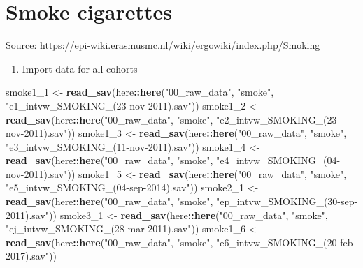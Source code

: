 \documentclass[]{book}
\newenvironment{Shaded}{\begin{snugshade}}{\end{snugshade}}
\newcommand{\DecValTok}[1]{\textcolor[rgb]{0.00,0.00,0.81}{#1}}
\newcommand{\KeywordTok}[1]{\textcolor[rgb]{0.13,0.29,0.53}{\textbf{#1}}}
\newcommand{\NormalTok}[1]{#1}
\newcommand{\OperatorTok}[1]{\textcolor[rgb]{0.81,0.36,0.00}{\textbf{#1}}}
\newcommand{\StringTok}[1]{\textcolor[rgb]{0.31,0.60,0.02}{#1}}
\providecommand{\tightlist}{%
  \setlength{\itemsep}{0pt}\setlength{\parskip}{0pt}}
\begin{document}
\hypertarget{smoke_cig}{%
\chapter{Smoke cigarettes}\label{smoke_cig}}

Source: \url{https://epi-wiki.erasmusmc.nl/wiki/ergowiki/index.php/Smoking}

\begin{enumerate}
\def\labelenumi{\arabic{enumi}.}
\tightlist
\item
  Import data for all cohorts
\end{enumerate}

\begin{Shaded}
\begin{Highlighting}[]
\NormalTok{smoke1_}\DecValTok{1}\NormalTok{ <-}\StringTok{ }\KeywordTok{read_sav}\NormalTok{(here}\OperatorTok{::}\KeywordTok{here}\NormalTok{(}\StringTok{"00_raw_data"}\NormalTok{, }\StringTok{"smoke"}\NormalTok{, }\StringTok{"e1_intvw_SMOKING_(23-nov-2011).sav"}\NormalTok{))}
\NormalTok{smoke1_}\DecValTok{2}\NormalTok{ <-}\StringTok{ }\KeywordTok{read_sav}\NormalTok{(here}\OperatorTok{::}\KeywordTok{here}\NormalTok{(}\StringTok{"00_raw_data"}\NormalTok{, }\StringTok{"smoke"}\NormalTok{, }\StringTok{"e2_intvw_SMOKING_(23-nov-2011).sav"}\NormalTok{))}
\NormalTok{smoke1_}\DecValTok{3}\NormalTok{ <-}\StringTok{ }\KeywordTok{read_sav}\NormalTok{(here}\OperatorTok{::}\KeywordTok{here}\NormalTok{(}\StringTok{"00_raw_data"}\NormalTok{, }\StringTok{"smoke"}\NormalTok{, }\StringTok{"e3_intvw_SMOKING_(11-nov-2011).sav"}\NormalTok{))}
\NormalTok{smoke1_}\DecValTok{4}\NormalTok{ <-}\StringTok{ }\KeywordTok{read_sav}\NormalTok{(here}\OperatorTok{::}\KeywordTok{here}\NormalTok{(}\StringTok{"00_raw_data"}\NormalTok{, }\StringTok{"smoke"}\NormalTok{, }\StringTok{"e4_intvw_SMOKING_(04-nov-2011).sav"}\NormalTok{))}
\NormalTok{smoke1_}\DecValTok{5}\NormalTok{ <-}\StringTok{ }\KeywordTok{read_sav}\NormalTok{(here}\OperatorTok{::}\KeywordTok{here}\NormalTok{(}\StringTok{"00_raw_data"}\NormalTok{, }\StringTok{"smoke"}\NormalTok{, }\StringTok{"e5_intvw_SMOKING_(04-sep-2014).sav"}\NormalTok{))}
\NormalTok{smoke2_}\DecValTok{1}\NormalTok{ <-}\StringTok{ }\KeywordTok{read_sav}\NormalTok{(here}\OperatorTok{::}\KeywordTok{here}\NormalTok{(}\StringTok{"00_raw_data"}\NormalTok{, }\StringTok{"smoke"}\NormalTok{, }\StringTok{"ep_intvw_SMOKING_(30-sep-2011).sav"}\NormalTok{))}
\NormalTok{smoke3_}\DecValTok{1}\NormalTok{ <-}\StringTok{ }\KeywordTok{read_sav}\NormalTok{(here}\OperatorTok{::}\KeywordTok{here}\NormalTok{(}\StringTok{"00_raw_data"}\NormalTok{, }\StringTok{"smoke"}\NormalTok{, }\StringTok{"ej_intvw_SMOKING_(28-mar-2011).sav"}\NormalTok{))}
\NormalTok{smoke1_}\DecValTok{6}\NormalTok{ <-}\StringTok{ }\KeywordTok{read_sav}\NormalTok{(here}\OperatorTok{::}\KeywordTok{here}\NormalTok{(}\StringTok{"00_raw_data"}\NormalTok{, }\StringTok{"smoke"}\NormalTok{, }\StringTok{"e6_intvw_SMOKING_(20-feb-2017).sav"}\NormalTok{))}
\end{Highlighting}
\end{Shaded}
\end{document}
